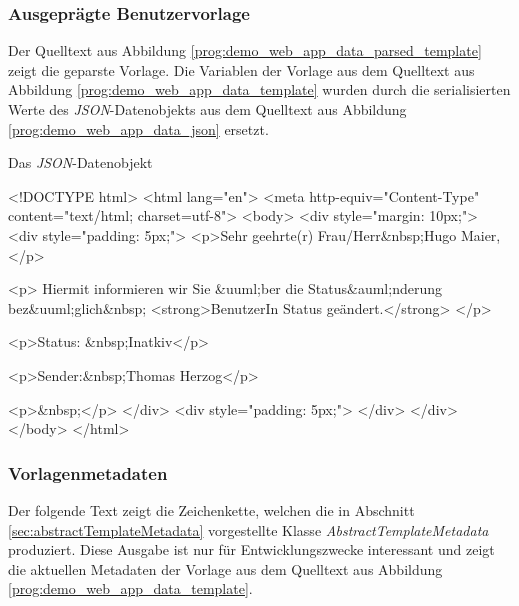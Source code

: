 \subsubsection{Ausgeprägte Benutzervorlage}
Der Quelltext aus Abbildung \ref{prog:demo_web_app_data_parsed_template} zeigt die geparste Vorlage. Die Variablen der Vorlage aus dem Quelltext aus Abbildung \ref{prog:demo_web_app_data_template} wurden durch die serialisierten Werte des \emph{JSON}-Datenobjekts aus dem Quelltext aus Abbildung \ref{prog:demo_web_app_data_json} ersetzt.

\begin{program}[h]
\caption{Das \emph{JSON}-Datenobjekt}
\label{prog:demo_web_app_data_parsed_template}
\begin{HtmlCode}
<!DOCTYPE html>
<html lang="en">
    <meta http-equiv="Content-Type" content="text/html; charset=utf-8">
<body>
<div style="margin: 10px;">
    <div style="padding: 5px;">
        <p>Sehr geehrte(r) Frau/Herr&nbsp;Hugo Maier,</p>

        <p>
            Hiermit informieren wir Sie &uuml;ber die 
            Status&auml;nderung bez&uuml;glich&nbsp;
            <strong>BenutzerIn Status geändert.</strong>
        </p>

        <p>Status: &nbsp;Inatkiv</p>

        <p>Sender:&nbsp;Thomas Herzog</p>

        <p>&nbsp;</p>
    </div>
    <div style="padding: 5px;">
    </div>
</div>
</body>
</html>
\end{HtmlCode}
\end{program}

\subsubsection{Vorlagenmetadaten}
Der folgende Text zeigt die Zeichenkette, welchen die in Abschnitt \ref{sec:abstractTemplateMetadata} vorgestellte Klasse \emph{AbstractTemplateMetadata} produziert. Diese Ausgabe ist nur für Entwicklungszwecke interessant und zeigt die aktuellen Metadaten der Vorlage aus dem Quelltext aus Abbildung \ref{prog:demo_web_app_data_template}.

